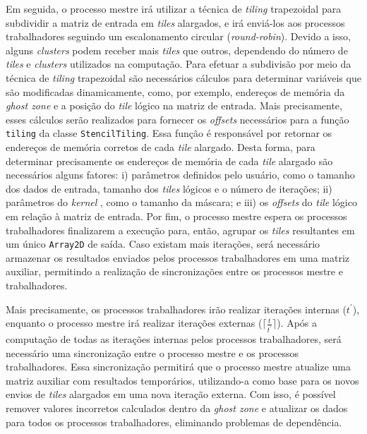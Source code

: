 Em seguida, o processo mestre irá utilizar a técnica de \textit{tiling}
trapezoidal para subdividir a matriz de entrada em \textit{tiles} alargados, e
irá enviá-los aos processos trabalhadores seguindo um escalonamento circular
(\textit{round-robin}).  Devido a isso, alguns \textit{clusters} podem receber
mais \textit{tiles} que outros, dependendo do número de \textit{tiles} e
\textit{clusters} utilizados na computação. Para efetuar a subdivisão por meio da técnica de \textit{tiling}
trapezoidal são necessários cálculos para determinar variáveis que são
modificadas dinamicamente, como, por exemplo, endereços de memória da
\textit{ghost zone} e a posição do \textit{tile} lógico na matriz de entrada.
Mais precisamente, esses cálculos serão realizados para fornecer os
\textit{offsets} necessários para a função \texttt{tiling} da classe
\texttt{StencilTiling}. Essa função é responsável por retornar os endereços de
memória corretos de cada \textit{tile} alargado. Desta forma, para determinar
precisamente os endereços de memória de cada \textit{tile} alargado são
necessários alguns fatores: i) parâmetros definidos pelo usuário, como o tamanho
dos dados de entrada, tamanho dos \textit{tiles} lógicos e o número de
iterações; ii) parâmetros do \textit{kernel} \stencil, como o tamanho da
máscara; e iii) os \textit{offsets} do \textit{tile} lógico em relação à matriz de
entrada. Por fim, o processo mestre espera os processos trabalhadores finalizarem a
execução para, então, agrupar os \textit{tiles} resultantes em um único \texttt{Array2D}
de saída. Caso existam mais iterações, será necessário armazenar os resultados
enviados pelos processos trabalhadores em uma matriz auxiliar, permitindo a realização
de sincronizações entre os processos mestre e trabalhadores.

Mais precisamente, os processos trabalhadores irão realizar iterações internas
($t^\prime$), enquanto o processo mestre irá realizar iterações externas
($\lceil\frac{t}{t^\prime}\rceil$). Após a computação de todas as iterações
internas pelos processos trabalhadores, será necessário uma sincronização entre
o processo mestre e os processos trabalhadores. Essa sincronização permitirá que
o processo mestre atualize uma matriz auxiliar com resultados temporários,
utilizando-a como base para os novos envios de \textit{tiles} alargados em uma
nova iteração externa. Com isso, é possível remover valores incorretos
calculados dentro da \textit{ghost zone} e atualizar os dados para todos os
processos trabalhadores, eliminando problemas de dependência.

